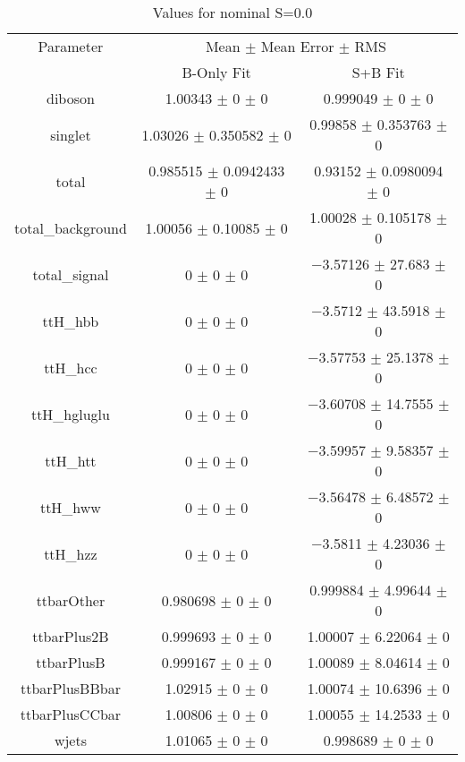 \begin{table}
\centering
\caption{Values for nominal S=0.0}
\begin{tabular}{ccc}
\toprule
Parameter & \multicolumn{2}{c}{Mean $\pm$ Mean Error $\pm$ RMS}\\
 & B-Only Fit & S+B Fit\\
\midrule
diboson & \num{1.00343} $\pm$ \num{0} $\pm$ \num{0} & \num{0.999049} $\pm$ \num{0} $\pm$ \num{0}\\
singlet & \num{1.03026} $\pm$ \num{0.350582} $\pm$ \num{0} & \num{0.99858} $\pm$ \num{0.353763} $\pm$ \num{0}\\
total & \num{0.985515} $\pm$ \num{0.0942433} $\pm$ \num{0} & \num{0.93152} $\pm$ \num{0.0980094} $\pm$ \num{0}\\
total\_background & \num{1.00056} $\pm$ \num{0.10085} $\pm$ \num{0} & \num{1.00028} $\pm$ \num{0.105178} $\pm$ \num{0}\\
total\_signal & \num{0} $\pm$ \num{0} $\pm$ \num{0} & \num{-3.57126} $\pm$ \num{27.683} $\pm$ \num{0}\\
ttH\_hbb & \num{0} $\pm$ \num{0} $\pm$ \num{0} & \num{-3.5712} $\pm$ \num{43.5918} $\pm$ \num{0}\\
ttH\_hcc & \num{0} $\pm$ \num{0} $\pm$ \num{0} & \num{-3.57753} $\pm$ \num{25.1378} $\pm$ \num{0}\\
ttH\_hgluglu & \num{0} $\pm$ \num{0} $\pm$ \num{0} & \num{-3.60708} $\pm$ \num{14.7555} $\pm$ \num{0}\\
ttH\_htt & \num{0} $\pm$ \num{0} $\pm$ \num{0} & \num{-3.59957} $\pm$ \num{9.58357} $\pm$ \num{0}\\
ttH\_hww & \num{0} $\pm$ \num{0} $\pm$ \num{0} & \num{-3.56478} $\pm$ \num{6.48572} $\pm$ \num{0}\\
ttH\_hzz & \num{0} $\pm$ \num{0} $\pm$ \num{0} & \num{-3.5811} $\pm$ \num{4.23036} $\pm$ \num{0}\\
ttbarOther & \num{0.980698} $\pm$ \num{0} $\pm$ \num{0} & \num{0.999884} $\pm$ \num{4.99644} $\pm$ \num{0}\\
ttbarPlus2B & \num{0.999693} $\pm$ \num{0} $\pm$ \num{0} & \num{1.00007} $\pm$ \num{6.22064} $\pm$ \num{0}\\
ttbarPlusB & \num{0.999167} $\pm$ \num{0} $\pm$ \num{0} & \num{1.00089} $\pm$ \num{8.04614} $\pm$ \num{0}\\
ttbarPlusBBbar & \num{1.02915} $\pm$ \num{0} $\pm$ \num{0} & \num{1.00074} $\pm$ \num{10.6396} $\pm$ \num{0}\\
ttbarPlusCCbar & \num{1.00806} $\pm$ \num{0} $\pm$ \num{0} & \num{1.00055} $\pm$ \num{14.2533} $\pm$ \num{0}\\
wjets & \num{1.01065} $\pm$ \num{0} $\pm$ \num{0} & \num{0.998689} $\pm$ \num{0} $\pm$ \num{0}\\
\bottomrule
\end{tabular}
\end{table}